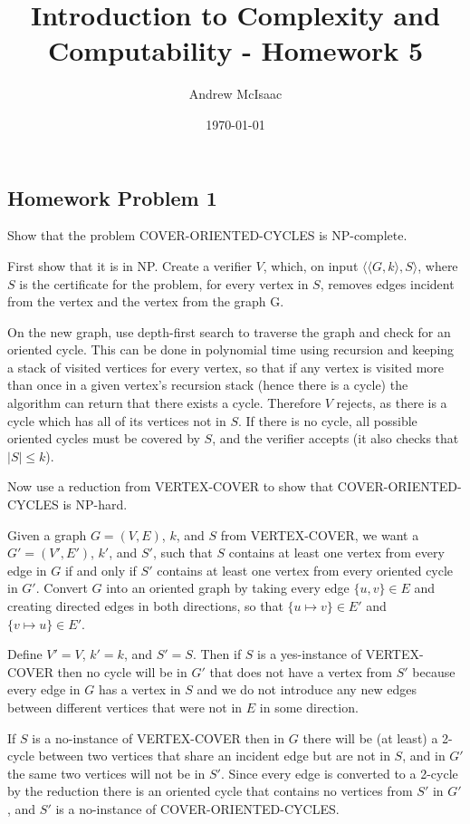 \documentclass[a4paper]{article}
\title{Introduction to Complexity and Computability - Homework 5}
\date{\today}
\author{Andrew McIsaac}
\begin{document}
\maketitle

\subsection*{Homework Problem 1}
Show that the problem COVER-ORIENTED-CYCLES is NP-complete.
\newline

First show that it is in NP. Create a verifier $V$, which, on input
$\langle \langle G, k \rangle, S \rangle$, where $S$ is the certificate for the
problem, for every vertex in $S$, removes edges incident from the vertex and the
vertex from the graph G.

On the new graph, use depth-first search to traverse the graph and check for an
oriented cycle. This can be done in polynomial time using recursion and keeping
a stack of visited vertices for every vertex, so that if any vertex is visited
more than once in a given vertex's recursion stack (hence there is a cycle) the
algorithm can return that there exists a cycle. Therefore $V$ rejects, as there
is a cycle which has all of its vertices not in $S$. If there is no cycle, all
possible oriented cycles must be covered by $S$, and the verifier accepts (it
also checks that $|S| \leq k$).
\newline

Now use a reduction from VERTEX-COVER to show that COVER-ORIENTED-CYCLES is
NP-hard.

Given a graph $G=(V,E)$, $k$, and $S$ from VERTEX-COVER, we want a $G'=(V',E')$,
$k'$, and $S'$, such that $S$ contains at least one vertex from every edge in
$G$ if and only if $S'$ contains at least one vertex from every oriented cycle
in $G'$. Convert $G$ into an oriented graph by taking every edge $\{u, v\} \in
E$ and creating directed edges in both directions, so that $\{u \mapsto v\} \in
E'$ and $\{v \mapsto u\} \in E'$.

Define $V'=V$, $k'=k$, and $S'=S$. Then if $S$ is a yes-instance of VERTEX-COVER
then no cycle will be in $G'$ that does not have a vertex from $S'$ because
every edge in $G$ has a vertex in $S$ and we do not introduce any new edges
between different vertices that were not in $E$ in some direction.

If $S$ is a no-instance of VERTEX-COVER then in $G$ there will be (at least) a
2-cycle between two vertices that share an incident edge but are not in $S$, and
in $G'$ the same two vertices will not be in $S'$. Since every edge is converted
to a 2-cycle by the reduction there is an oriented cycle that contains no
vertices from $S'$ in $G'$, and $S'$ is a no-instance of COVER-ORIENTED-CYCLES.
\newline
\end{document}
